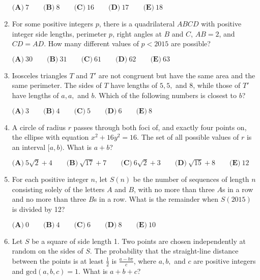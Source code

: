 \documentclass{article}
\begin{document}
\begin{enumerate}[label=\arabic*., itemsep=0.5em]
$ \textbf{(A)}\ 7 \qquad\textbf{(B)}\ 8 \qquad\textbf{(C)}\ 16 \qquad\textbf{(D)}\ 17 \qquad\textbf{(E)}\ 18$\par \vspace{0.5em}\item For some positive integers $p$, there is a quadrilateral $ABCD$ with positive integer side lengths, perimeter $p$, right angles at $B$ and $C$, $AB=2$, and $CD=AD$. How many different values of $p<2015$ are possible?

$ \textbf{(A)}\ 30 \qquad\textbf{(B)}\ 31 \qquad\textbf{(C)}\ 61 \qquad\textbf{(D)}\ 62 \qquad\textbf{(E)}\ 63$\par \vspace{0.5em}\item Isosceles triangles $T$ and $T'$ are not congruent but have the same area and the same perimeter. The sides of $T$ have lengths of $5,5,$ and $8$, while those of $T'$ have lengths of $a,a,$ and $b$. Which of the following numbers is closest to $b$?

$ \textbf{(A)}\ 3 \qquad\textbf{(B)}\ 4 \qquad\textbf{(C)}\ 5 \qquad\textbf{(D)}\ 6 \qquad\textbf{(E)}\ 8$\par \vspace{0.5em}\item A circle of radius $r$ passes through both foci of, and exactly four points on, the ellipse with equation $x^2+16y^2=16$. The set of all possible values of $r$ is an interval $[a,b)$. What is $a+b$?

$ \textbf{(A)}\ 5\sqrt{2}+4 \qquad\textbf{(B)}\ \sqrt{17}+7 \qquad\textbf{(C)}\ 6\sqrt{2}+3 \qquad\textbf{(D)}\ \sqrt{15}+8 \qquad\textbf{(E)}\ 12$\par \vspace{0.5em}\item For each positive integer $n$, let $S(n)$ be the number of sequences of length $n$ consisting solely of the letters $A$ and $B$, with no more than three $A$s in a row and no more than three $B$s in a row. What is the remainder when $S(2015)$ is divided by 12?

$ \textbf{(A)}\ 0 \qquad\textbf{(B)}\ 4 \qquad\textbf{(C)}\ 6 \qquad\textbf{(D)}\ 8 \qquad\textbf{(E)}\ 10$\par \vspace{0.5em}\item Let $S$ be a square of side length 1. Two points are chosen independently at random on the sides of $S$. The probability that the straight-line distance between the points is at least $\frac12$ is $\frac{a-b\pi}{c}$, where $a,b,$ and $c$ are positive integers and $\text{gcd}(a,b,c) = 1$. What is $a+b+c$?


\end{enumerate}
\end{document}

